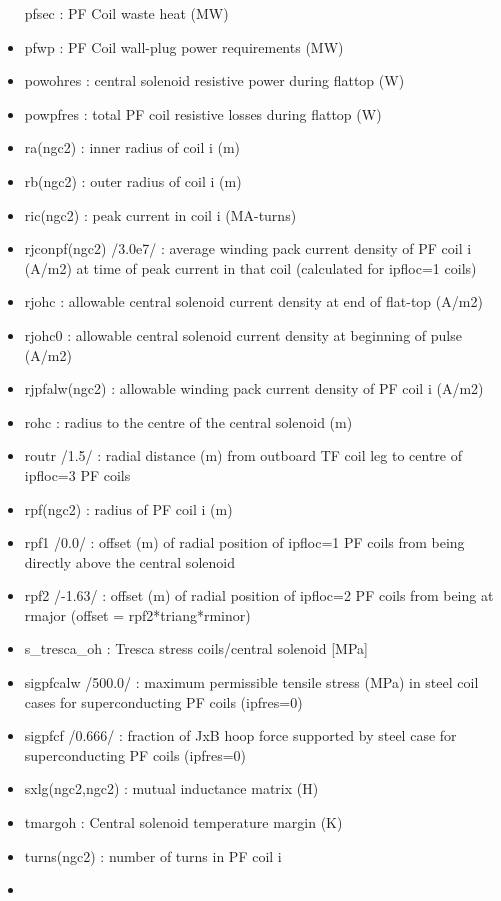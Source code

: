 \documentclass[]{article}
\begin{document}
\begin{itemize}
  pfsec : PF Coil waste heat (MW)
\item
  pfwp : PF Coil wall-plug power requirements (MW)
\item
  powohres : central solenoid resistive power during flattop (W)
\item
  powpfres : total PF coil resistive losses during flattop (W)
\item
  ra(ngc2) : inner radius of coil i (m)
\item
  rb(ngc2) : outer radius of coil i (m)
\item
  ric(ngc2) : peak current in coil i (MA-turns)
\item
  rjconpf(ngc2) /3.0e7/ : average winding pack current density of PF
  coil i (A/m2) at time of peak current in that coil (calculated for
  ipfloc=1 coils)
\item
  rjohc : allowable central solenoid current density at end of flat-top
  (A/m2)
\item
  rjohc0 : allowable central solenoid current density at beginning of
  pulse (A/m2)
\item
  rjpfalw(ngc2) : allowable winding pack current density of PF coil i
  (A/m2)
\item
  rohc : radius to the centre of the central solenoid (m)
\item
  routr /1.5/ : radial distance (m) from outboard TF coil leg to centre
  of ipfloc=3 PF coils
\item
  rpf(ngc2) : radius of PF coil i (m)
\item
  rpf1 /0.0/ : offset (m) of radial position of ipfloc=1 PF coils from
  being directly above the central solenoid
\item
  rpf2 /-1.63/ : offset (m) of radial position of ipfloc=2 PF coils from
  being at rmajor (offset = rpf2*triang*rminor)
\item
  s\_tresca\_oh : Tresca stress coils/central solenoid {[}MPa{]}
\item
  sigpfcalw /500.0/ : maximum permissible tensile stress (MPa) in steel
  coil cases for superconducting PF coils (ipfres=0)
\item
  sigpfcf /0.666/ : fraction of JxB hoop force supported by steel case
  for superconducting PF coils (ipfres=0)
\item
  sxlg(ngc2,ngc2) : mutual inductance matrix (H)
\item
  tmargoh : Central solenoid temperature margin (K)
\item
  turns(ngc2) : number of turns in PF coil i
\item

\end{itemize}
\end{document}
